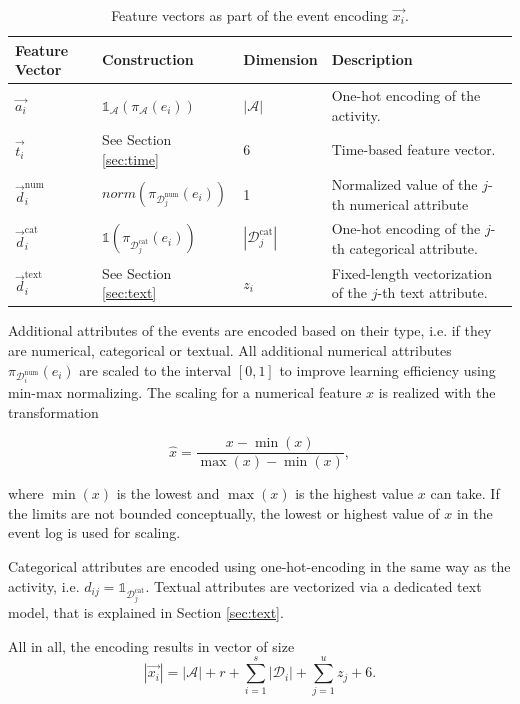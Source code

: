 \begin{table}[!htbp]
	\renewcommand{\arraystretch}{1.2}
	\setlength\tabcolsep{5pt}
	\begin{tabularx}{\textwidth}{p{2cm} l l p{6.8cm} }
		\toprule
		\textbf{Feature} \newline \textbf{Vector} & \textbf{Construction} &\textbf{Dimension} &  \textbf{Description} \\
		\midrule
		$\vec{a_i}$ &$\mathds{1}_\mathcal{A}(\pi_\mathcal{A}(e_i))$& $|\mathcal{A}|$& One-hot encoding of the activity. \\
		$\vec{t_i}$ & See Section \ref{sec:time} &6 & Time-based feature vector.\\
		$\vec{d}_i^\mathrm{num}$ &  $norm(\pi_{\mathcal{D}_j^\mathrm{num}}(e_i)) $ &1 & Normalized value of the $j$-th numerical attribute\\
		$\vec{d}_i^\mathrm{cat}$ & $\mathds{1}(\pi_{\mathcal{D}_j^\mathrm{cat}}(e_i))$&$|\mathcal{D}_j^\mathrm{cat}|$ & One-hot encoding of the $j$-th categorical attribute.\\
		$\vec{d}_i^\mathrm{text}$ & See Section \ref{sec:text} & $z_i$& Fixed-length vectorization of the $j$-th text attribute.\\
		\bottomrule
	\end{tabularx}
	\caption[Feature vectors as part of the event encoding]{Feature vectors as part of the event encoding $\vec{x_i}$.}
	\label{tab:features}
\end{table}

Additional attributes of the events are encoded based on their type, i.e. if they are numerical, categorical or textual.
All additional numerical attributes $\pi_{\mathcal{D}_i^\mathrm{num}} (e_i)$ are scaled to the interval $ [0, 1]$ to improve learning efficiency using min-max normalizing.
The scaling for a numerical feature $x$ is realized with the transformation

$$\hat{x} = \dfrac{x-\min(x)}{\max(x) - \min(x)},$$

where $\min(x)$ is the lowest and $\max(x)$ is the highest value $x$ can take.
If the limits are not bounded conceptually, the lowest or highest value of $x$ in the event log is used for scaling.

Categorical attributes are encoded using one-hot-encoding in the same way as the activity, i.e. $d_{ij} = \mathds{1}_{\mathcal{D}_j^{\mathrm{cat}}}$.
Textual attributes are vectorized via a dedicated text model, that is explained in Section \ref{sec:text}.

All in all, the encoding results in vector of size
\begin{equation*}
|\vec{x_i}|= |\mathcal{A}| + r + \sum_{i=1}^{s} |\mathcal{D}_i| + \sum_{j=1}^{u} z_j + 6.
\end{equation*}


